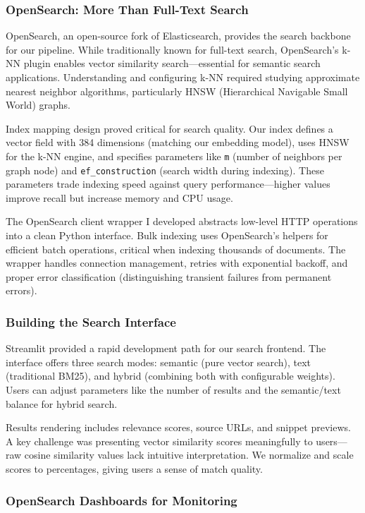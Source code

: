 \documentclass[12pt, a4paper]{article}
\begin{document}
\subsubsection*{OpenSearch: More Than Full-Text Search}

OpenSearch, an open-source fork of Elasticsearch, provides the search backbone for our pipeline. While traditionally known for full-text search, OpenSearch's k-NN plugin enables vector similarity search—essential for semantic search applications. Understanding and configuring k-NN required studying approximate nearest neighbor algorithms, particularly HNSW (Hierarchical Navigable Small World) graphs.

Index mapping design proved critical for search quality. Our index defines a vector field with 384 dimensions (matching our embedding model), uses HNSW for the k-NN engine, and specifies parameters like \texttt{m} (number of neighbors per graph node) and \texttt{ef\_construction} (search width during indexing). These parameters trade indexing speed against query performance—higher values improve recall but increase memory and CPU usage.

The OpenSearch client wrapper I developed abstracts low-level HTTP operations into a clean Python interface. Bulk indexing uses OpenSearch's helpers for efficient batch operations, critical when indexing thousands of documents. The wrapper handles connection management, retries with exponential backoff, and proper error classification (distinguishing transient failures from permanent errors).

\subsubsection*{Building the Search Interface}

Streamlit provided a rapid development path for our search frontend. The interface offers three search modes: semantic (pure vector search), text (traditional BM25), and hybrid (combining both with configurable weights). Users can adjust parameters like the number of results and the semantic/text balance for hybrid search.

Results rendering includes relevance scores, source URLs, and snippet previews. A key challenge was presenting vector similarity scores meaningfully to users—raw cosine similarity values lack intuitive interpretation. We normalize and scale scores to percentages, giving users a sense of match quality.

\subsubsection*{OpenSearch Dashboards for Monitoring}
\end{document}
